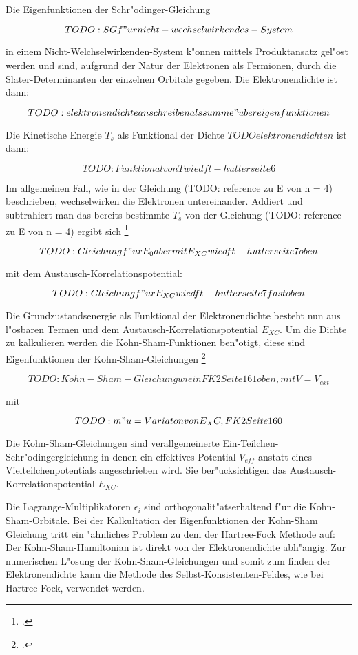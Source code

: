 Die Eigenfunktionen der Schr"odinger-Gleichung

$$TODO: SG f"ur nicht-wechselwirkendes-System$$

in einem Nicht-Welchselwirkenden-System k"onnen mittels Produktansatz gel"ost werden und sind, aufgrund der Natur der Elektronen als Fermionen, durch die Slater-Determinanten der einzelnen Orbitale gegeben. Die Elektronendichte ist dann:

$$TODO: elektronendichte anschreiben als summe "uber eigenfunktionen$$

Die Kinetische Energie $T_s$  als Funktional der Dichte $TODO elektronendichte n$ ist dann: 

$$TODO: Funktional von T wie dft-hutter seite 6$$

Im allgemeinen Fall, wie in der Gleichung (TODO: reference zu E von n = 4) beschrieben, wechselwirken die Elektronen untereinander. Addiert und subtrahiert man das bereits bestimmte $T_s$ von der Gleichung  (TODO: reference zu E von n = 4) ergibt sich \footcite[7]{dft-hutter}

$$TODO: Gleichung f"ur E_0 aber mit E_{XC} wie dft-hutter seite 7 oben$$

mit dem Austausch-Korrelationspotential: 

$$TODO: Gleichung f"ur E_{XC} wie dft-hutter seite 7 fast oben$$

Die Grundzustandsenergie als Funktional der Elektronendichte besteht nun aus l"osbaren Termen und dem Austausch-Korrelationspotential $E_{XC}$. Um die Dichte zu kalkulieren werden die Kohn-Sham-Funktionen ben"otigt,  diese sind Eigenfunktionen der Kohn-Sham-Gleichungen \footcite[161]{fk2}

$$TODO: Kohn-Sham-Gleichung wie in FK2 Seite 161 oben, mit V = V_{ext}$$

 
mit

$$TODO: m"u = Variaton von E_XC, FK2 Seite 160$$


Die Kohn-Sham-Gleichungen sind verallgemeinerte Ein-Teilchen-Schr"odingergleichung in denen ein effektives Potential $V_{eff}$ anstatt eines Vielteilchenpotentials angeschrieben wird. Sie ber"ucksichtigen das Austausch-Korrelationspotential $E_{XC}$. 

Die Lagrange-Multiplikatoren $\epsilon_i$ sind orthogonalit"atserhaltend f"ur die Kohn-Sham-Orbitale. Bei der Kalkultation der Eigenfunktionen der Kohn-Sham Gleichung tritt ein "ahnliches Problem zu dem der Hartree-Fock Methode auf: Der Kohn-Sham-Hamiltonian ist direkt von der Elektronendichte abh"angig. Zur numerischen L"osung der Kohn-Sham-Gleichungen und somit zum finden der Elektronendichte kann die Methode des Selbst-Konsistenten-Feldes, wie bei Hartree-Fock, verwendet werden. 

